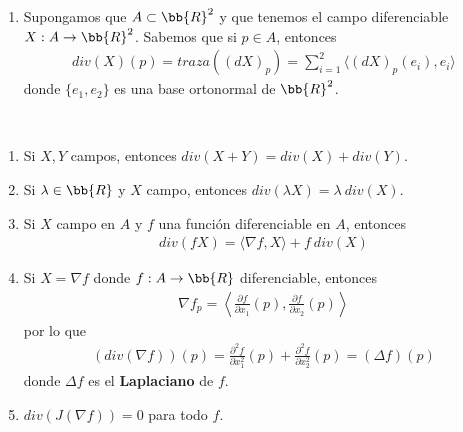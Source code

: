 \begin{observacion}
\begin{enumerate}
        Supongamos que $\alpha: \bb{R} \to \bb{R}^2$ es una parametrización regular \underline{no parametrizada por el arco} en general, $A$-periódica, con $\alpha_{|_{[0,A)}}$ inyectiva, $tr(\alpha)=C$ y tal que $\alpha$ orienta positivamente a $C$. El teorema de la divergencia se escribirá de la siguiente forma:
        \begin{gather*}
            \int_\Omega div(X) = - \int_C \langle X,N \rangle = - \int_0^A \langle X_{\alpha(t)}, J\alpha'(t)\rangle dt
        \end{gather*}
        Esto se puede ver aplicando el \hyperref[teo:cambio_variable]{Teorema de Cambio de Variable} al \hyperref[teo:area]{Teorema del Área} (se deja como ejercicio el cálculo concreto).

        \item Supongamos que $A\subset \bb{R}^2$ y que tenemos el campo diferenciable $X: A \to \bb{R}^2$. Sabemos que si $p\in A$, entonces
        \begin{gather*}
            div(X)(p) = traza((dX)_p) = \sum_{i=1}^2 \langle (dX)_p(e_i), e_i \rangle
        \end{gather*}
        donde $\{e_1, e_2\}$ es una base ortonormal de $\bb{R}^2$.
    \end{enumerate}
\end{observacion}

\begin{propiedades}\
    \begin{enumerate}
        \item Si $X,Y$ campos, entonces $div(X+Y)=div(X)+div(Y)$.
        \item Si $\lambda\in \bb{R}$ y $X$ campo, entonces $div(\lambda X) = \lambda\ div(X)$.
        \item Si $X$ campo en $A$ y $f$ una función diferenciable en $A$, entonces
        \begin{gather*}
            div(fX) = \langle \nabla f, X \rangle + f\ div(X)
        \end{gather*}
        \item Si $X=\nabla f$ donde $f:A\to \bb{R}$ diferenciable, entonces
        \begin{gather*}
            \nabla f_p = \left\langle \frac{\partial f}{\partial x_1}(p), \frac{\partial f}{\partial x_2}(p) \right\rangle
        \end{gather*}
        por lo que 
        \begin{gather*}
            (div (\nabla f))(p) = \frac{\partial^2 f}{\partial x_1^2}(p) + \frac{\partial^2 f}{\partial x_2^2}(p) = (\Delta f)(p)
        \end{gather*}
        donde $\Delta f$ es el \textbf{Laplaciano} de $f$.
        \item $div(J(\nabla f)) = 0$ para todo $f$.
    \end{enumerate}
\end{propiedades}

